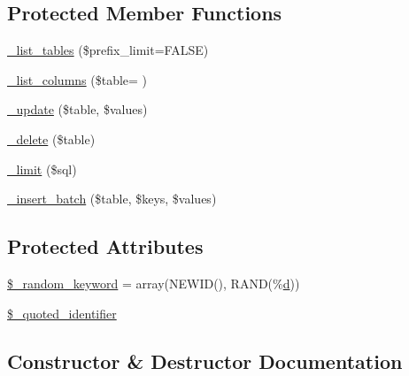 \subsection*{Protected Member Functions}
\begin{DoxyCompactItemize}
\item 
\hyperlink{class_c_i___d_b__pdo__sqlsrv__driver_a435c0f3ce54fe7daa178baa8532ebd54}{\+\_\+list\+\_\+tables} (\$prefix\+\_\+limit=F\+A\+L\+S\+E)
\item 
\hyperlink{class_c_i___d_b__pdo__sqlsrv__driver_a2a81bb476a5c76fe6f763b0557c1e4c2}{\+\_\+list\+\_\+columns} (\$table= \textquotesingle{}\textquotesingle{})
\item 
\hyperlink{class_c_i___d_b__pdo__sqlsrv__driver_a2540b03a93fa73ae74c10d0e16fc073e}{\+\_\+update} (\$table, \$values)
\item 
\hyperlink{class_c_i___d_b__pdo__sqlsrv__driver_a133ea8446ded52589bd22cc9163d0896}{\+\_\+delete} (\$table)
\item 
\hyperlink{class_c_i___d_b__pdo__sqlsrv__driver_a3a02ea06541b8ecc25a33a61651562c8}{\+\_\+limit} (\$sql)
\item 
\hyperlink{class_c_i___d_b__pdo__sqlsrv__driver_a1978e1358c812587a46e242630365099}{\+\_\+insert\+\_\+batch} (\$table, \$keys, \$values)
\end{DoxyCompactItemize}
\subsection*{Protected Attributes}
\begin{DoxyCompactItemize}
\item 
\hyperlink{class_c_i___d_b__pdo__sqlsrv__driver_a10213aa6e05f6d924d3277bb1d2fea00}{\$\+\_\+random\+\_\+keyword} = array(\textquotesingle{}N\+E\+W\+I\+D()\textquotesingle{}, \textquotesingle{}R\+A\+N\+D(\%\hyperlink{assets_2js_2bootstrap_8min_8js_aeb337d295abaddb5ec3cb34cc2e2bbc9}{d})\textquotesingle{})
\item 
\hyperlink{class_c_i___d_b__pdo__sqlsrv__driver_a1dae2f0e9ad7299438a9976d6cdbf2ad}{\$\+\_\+quoted\+\_\+identifier}
\end{DoxyCompactItemize}


\subsection{Constructor \& Destructor Documentation}
\hypertarget{class_c_i___d_b__pdo__sqlsrv__driver_a9162320adff1a1a4afd7f2372f753a3e}{}
